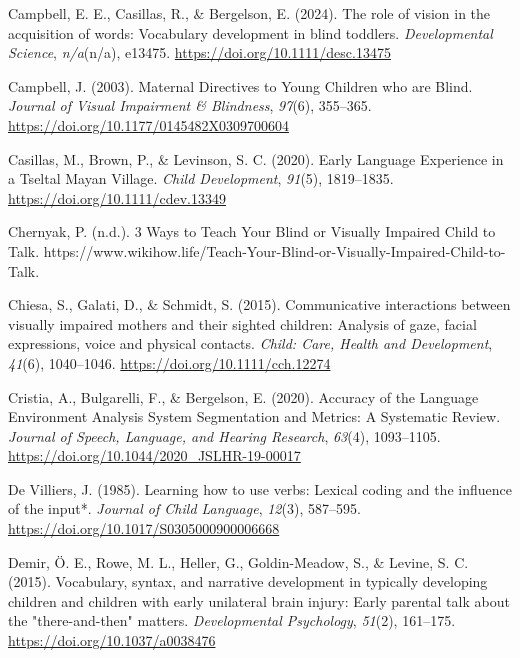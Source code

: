 \documentclass[
  man,floatsintext]{apa6}
\newlength{\cslhangindent}
\newlength{\cslentryspacingunit} %
\newenvironment{CSLReferences}[2] %
 {%
  \setlength{\parindent}{0pt}
  \ifodd #1
  \let\oldpar\par
  \def\par{\hangindent=\cslhangindent\oldpar}
  \fi
  \setlength{\parskip}{#2\cslentryspacingunit}
 }%
 {}
\begin{document}
\begin{CSLReferences}{1}{0}
\leavevmode{}%
Campbell, E. E., Casillas, R., \& Bergelson, E. (2024). The role of vision in the acquisition of words: {Vocabulary} development in blind toddlers. \emph{Developmental Science}, \emph{n/a}(n/a), e13475. \url{https://doi.org/10.1111/desc.13475}

\leavevmode{}%
Campbell, J. (2003). Maternal {Directives} to {Young Children} who are {Blind}. \emph{Journal of Visual Impairment \& Blindness}, \emph{97}(6), 355--365. \url{https://doi.org/10.1177/0145482X0309700604}

\leavevmode{}%
Casillas, M., Brown, P., \& Levinson, S. C. (2020). Early {Language Experience} in a {Tseltal Mayan Village}. \emph{Child Development}, \emph{91}(5), 1819--1835. \url{https://doi.org/10.1111/cdev.13349}

\leavevmode{}%
Chernyak, P. (n.d.). 3 {Ways} to {Teach Your Blind} or {Visually Impaired Child} to {Talk}. https://www.wikihow.life/Teach-Your-Blind-or-Visually-Impaired-Child-to-Talk.

\leavevmode{}%
Chiesa, S., Galati, D., \& Schmidt, S. (2015). Communicative interactions between visually impaired mothers and their sighted children: Analysis of gaze, facial expressions, voice and physical contacts. \emph{Child: Care, Health and Development}, \emph{41}(6), 1040--1046. \url{https://doi.org/10.1111/cch.12274}

\leavevmode{}%
Cristia, A., Bulgarelli, F., \& Bergelson, E. (2020). Accuracy of the {Language Environment Analysis System Segmentation} and {Metrics}: {A Systematic Review}. \emph{Journal of Speech, Language, and Hearing Research}, \emph{63}(4), 1093--1105. \url{https://doi.org/10.1044/2020_JSLHR-19-00017}

\leavevmode{}%
De Villiers, J. (1985). Learning how to use verbs: Lexical coding and the influence of the input*. \emph{Journal of Child Language}, \emph{12}(3), 587--595. \url{https://doi.org/10.1017/S0305000900006668}

\leavevmode{}%
Demir, Ö. E., Rowe, M. L., Heller, G., Goldin-Meadow, S., \& Levine, S. C. (2015). Vocabulary, syntax, and narrative development in typically developing children and children with early unilateral brain injury: Early parental talk about the "there-and-then" matters. \emph{Developmental Psychology}, \emph{51}(2), 161--175. \url{https://doi.org/10.1037/a0038476}


\end{CSLReferences}
\end{document}
